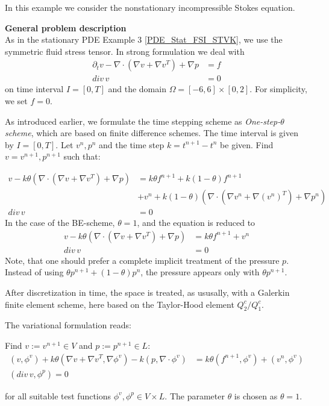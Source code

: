 In this example we consider the nonstationary incompressible Stokes equation. 

\textbf{General problem description}\\
As in the stationary PDE Example 3 \ref{PDE_Stat_FSI_STVK},
we use the symmetric fluid stress tensor.  
In strong formulation we deal with 
\begin{align*}
\partial_t v -\nabla\cdot (\nabla v + \nabla v^{T}) + \nabla p &= f \\
div\, v &= 0 
\end{align*}
on time interval $I=[0,T]$ and the domain 
$\Omega = [-6,6]\times [0,2]$. For simplicity,  we set $f=0$.

As introduced earlier, 
we formulate the time stepping scheme as \textit{One-step-$\theta$ scheme},
which are based on finite difference schemes. 
The time interval is given by $I=[0,T]$. Let $v^n,p^n$ and the time
step $k=t^{n+1}-t^n$ be given. Find $v=v^{n+1}, p^{n+1}$ such that:

\begin{align*}
v - k\theta (\nabla\cdot (\nabla v + \nabla v^{T}) + \nabla p) &=
k\theta f^{n+1} + k(1-\theta)f^{n+1}\\
&+  v^n + k(1-\theta) (\nabla\cdot (\nabla v^n + \nabla (v^n)^{T}) 
+ \nabla p^n) \\
div \,v &= 0 
\end{align*}
In the case of the BE-scheme, $\theta = 1$, and the equation is reduced to
\begin{align*}
v - k\theta (\nabla\cdot (\nabla v + \nabla v^{T}) + \nabla p) &=
k\theta f^{n+1} +  v^n  \\
div \,v &= 0
\end{align*}
Note, that one should prefer a complete implicit treatment of the
pressure $p$. Instead of using $\theta p^{n+1} + (1-\theta)p^n$, the pressure
appears only with $\theta p^{n+1}$.

After discretization in time, the space is treated, as ususally, with 
a Galerkin finite element scheme, here based on the Taylor-Hood element 
$Q_2^c / Q_1^c$.

The variational formulation reads:

\begin{Problem}
Find $v:= v^{n+1}\in V$ and $p:= p^{n+1}\in L$:
\begin{align*}
(v,\phi^v) + k\theta (\nabla v + \nabla v^{T}, \nabla\phi^v) 
- k  (p, \nabla\cdot\phi^v) &=
k\theta (f^{n+1},\phi^v) +  (v^n,\phi^v)\\
(div \,v,\phi^p) = 0  
\end{align*}
\end{Problem}
for all suitable test functions ${\phi^v , \phi^p} \in V\times L$. 
The parameter $\theta$ is chosen as $\theta =1$.

